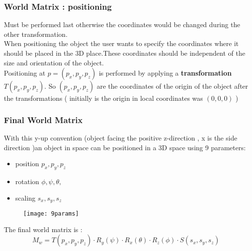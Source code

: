 \subsubsection{World Matrix : positioning}
Must be performed last otherwise the coordinates would be changed during the other transformation.\\
When positioning the object the user wants to specify the coordinates where it should be placed in the 3D place.These coordinates should be independent of the size and orientation of the object.\\
Positioning at $p=(p_x,p_y,p_z)$ is performed by applying a \textbf{transformation} $T(p_x,p_y,p_z)$. So $(p_x,p_y,p_z)$ are the coordinates of the origin of the object after the transformations ( initially is the origin in local coordinates was $(0,0,0)$ )

\subsubsection{Final World Matrix}
With this y-up convention (object facing the positive z-direction , x is the side direction )an object in space can be positioned in a 3D space using 9 parameters:
\begin{itemize}
\item position $p_x,p_y,p_z$
\item rotation $\phi, \psi,\theta,$
\item scaling $s_x,s_y,s_z$
\end{itemize}
\begin{figure}[H]
  \centering
  \texttt{[image: 9params]}
\end{figure}
The final world matrix is :
\[
\boxed{M_w = T(p_x,p_y,p_z)\cdot R_y(\psi) \cdot R_x(\theta) \cdot R_z(\phi) \cdot S(s_x,s_y,s_z)}
\]

